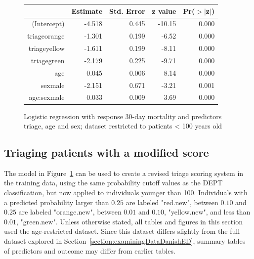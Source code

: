 \begin{figure}[ht]
\centering
\begin{tabular}{rrrrr}
  \hline
 & Estimate & Std. Error & z value & Pr($>$$|$z$|$) \\ 
  \hline
(Intercept) & -4.518 & 0.445 & -10.15 & 0.000 \\ 
  triageorange & -1.301 & 0.199 & -6.52 & 0.000 \\ 
  triageyellow & -1.611 & 0.199 & -8.11 & 0.000 \\ 
  triagegreen & -2.179 & 0.225 & -9.71 & 0.000 \\ 
  age & 0.045 & 0.006 & 8.14 & 0.000 \\ 
  sexmale & -2.151 & 0.671 & -3.21 & 0.001 \\ 
  age:sexmale & 0.033 & 0.009 & 3.69 & 0.000 \\ 
   \hline
\end{tabular}
\caption{Logistic regression with response 30-day mortality and 
       predictors triage, age and sex; dataset restricted to patients < 100 years old} 
\label{figure:triageAgeSexMort30AgeRestrLogreg}
\end{figure}



\subsection{Triaging patients with a modified score}
\label{section:triageWithModifiedScore}


The model in Figure~\ref{figure:triageAgeSexMort30AgeRestrLogreg} can be used to create a revised triage scoring system in the training data, using the same probability cutoff values as the DEPT classification, but now applied to individuals younger than 100.  Individuals with a predicted probability larger than $0.25$ are labeled "red.new", between $0.10$ and $0.25$ are labeled "orange.new", between $0.01$ and $0.10$, "yellow.new", and less than $0.01$, "green.new".  Unless otherwise stated, all tables and figures in this section used the age-restricted dataset. Since this dataset differs slightly from the full dataset explored in Section~\ref{section:examiningDataDanishED}, summary tables of predictors and outcome may differ from earlier tables. 

